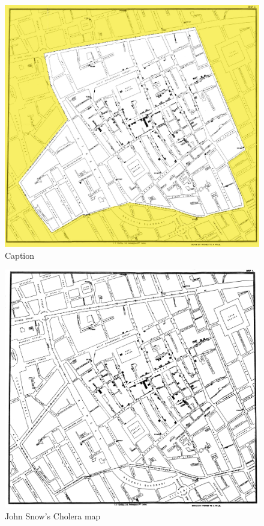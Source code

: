 \documentclass[12pt]{article}
\begin{document}
    \begin{figure}
    \centering
    \includegraphics{snowmap_1854}
    \caption{Caption}
    \label{fig:snow}
    \end{figure}
    
    \begin{figure}
    \centering
    \includegraphics[scale=0.1]{Snow-cholera-map-1}
    \caption{John Snow's Cholera map}
    \label{fig:snow}
    \end{figure}
\end{document}
